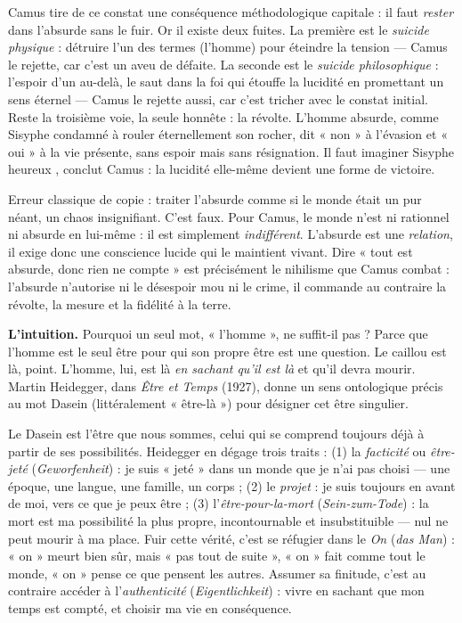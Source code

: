 \documentclass[11pt]{article}
\newcommand{\cle}[1]{{\popxbold\color{popdark}#1}}
\newcounter{popsec}
\newcounter{popsub}
\newcommand{\courssub}[1]{%
  \stepcounter{popsub}%
  \par\vspace{9pt}\noindent{\popxbold\fontsize{11.5}{13}\selectfont\color{popink}{\color{poporange}\thepopsec.\thepopsub}\hspace{6pt}#1}\par\nopagebreak\vspace{4pt}
}
\begin{document}
Camus tire de ce constat une conséquence méthodologique capitale : il faut \emph{rester} dans l'absurde sans le fuir. Or il existe deux fuites. La première est le \emph{suicide physique} : détruire l'un des termes (l'homme) pour éteindre la tension — Camus le rejette, car c'est un aveu de défaite. La seconde est le \emph{suicide philosophique} : l'espoir d'un au-delà, le saut dans la foi qui étouffe la lucidité en promettant un sens éternel — Camus le rejette aussi, car c'est tricher avec le constat initial. Reste la troisième voie, la seule honnête : la \cle{révolte}. L'homme absurde, comme Sisyphe condamné à rouler éternellement son rocher, dit « non » à l'évasion et « oui » à la vie présente, sans espoir mais sans résignation. \guillemotleft Il faut imaginer Sisyphe heureux \guillemotright, conclut Camus : la lucidité elle-même devient une forme de victoire.

\begin{attention}
Erreur classique de copie : traiter l'absurde comme si le monde était un pur néant, un chaos insignifiant. C'est faux. Pour Camus, le monde n'est ni rationnel ni absurde en lui-même : il est simplement \emph{indifférent}. L'absurde est une \emph{relation}, il exige donc une conscience lucide qui le maintient vivant. Dire « tout est absurde, donc rien ne compte » est précisément le nihilisme que Camus combat : l'absurde n'autorise ni le désespoir mou ni le crime, il commande au contraire la révolte, la mesure et la fidélité à la terre.
\end{attention}

\courssub{Heidegger : le Dasein, l'angoisse et l'authenticité}

\textbf{L'intuition.} Pourquoi un seul mot, « l'homme », ne suffit-il pas ? Parce que l'homme est le seul être pour qui son propre être est une question. Le caillou est là, point. L'homme, lui, est là \emph{en sachant qu'il est là} et qu'il devra mourir. Martin Heidegger, dans \emph{Être et Temps} (1927), donne un sens ontologique précis au mot \cle{Dasein} (littéralement « être-là ») pour désigner cet être singulier.

\begin{propriete}
Le Dasein est l'être que nous sommes, celui qui se comprend toujours déjà à partir de ses possibilités. Heidegger en dégage trois traits : (1) la \emph{facticité} ou \emph{être-jeté} (\emph{Geworfenheit}) : je suis « jeté » dans un monde que je n'ai pas choisi — une époque, une langue, une famille, un corps ; (2) le \emph{projet} : je suis toujours en avant de moi, vers ce que je peux être ; (3) l'\emph{être-pour-la-mort} (\emph{Sein-zum-Tode}) : la mort est ma possibilité la plus propre, incontournable et insubstituible — nul ne peut mourir à ma place. Fuir cette vérité, c'est se réfugier dans le \emph{On} (\emph{das Man}) : « on » meurt bien sûr, mais « pas tout de suite », « on » fait comme tout le monde, « on » pense ce que pensent les autres. Assumer sa finitude, c'est au contraire accéder à l'\emph{authenticité} (\emph{Eigentlichkeit}) : vivre en sachant que mon temps est compté, et choisir ma vie en conséquence.
\end{propriete}
\end{document}

